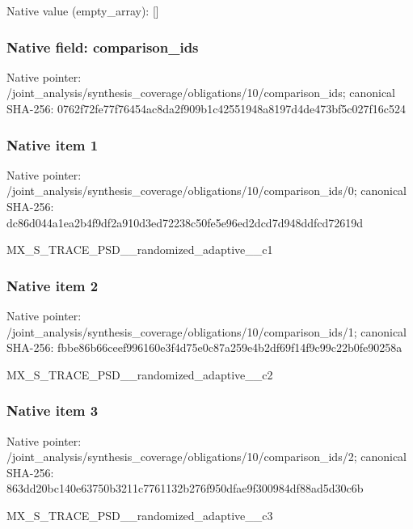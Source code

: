 \documentclass[10pt,a4paper]{article}
\begin{document}
Native value (empty\_\allowbreak{}array): []

\subsubsection{Native field: comparison\_\allowbreak{}ids}
Native pointer: /joint\_\allowbreak{}analysis/synthesis\_\allowbreak{}coverage/obligations/10/comparison\_\allowbreak{}ids; canonical SHA-256: 0762f72fe77f76454ac8da2f909b1c42551948a8197d4de473bf5c027f16c524

\subsubsection{Native item 1}
Native pointer: /joint\_\allowbreak{}analysis/synthesis\_\allowbreak{}coverage/obligations/10/comparison\_\allowbreak{}ids/0; canonical SHA-256: dc86d044a1ea2b4f9df2a910d3ed72238c50fe5e96ed2dcd7d948ddfcd72619d

\begingroup\raggedright\sloppy MX\_\allowbreak{}S\_\allowbreak{}TRACE\_\allowbreak{}PSD\_\allowbreak{}\_\allowbreak{}randomized\_\allowbreak{}adaptive\_\allowbreak{}\_\allowbreak{}c1\par\endgroup

\subsubsection{Native item 2}
Native pointer: /joint\_\allowbreak{}analysis/synthesis\_\allowbreak{}coverage/obligations/10/comparison\_\allowbreak{}ids/1; canonical SHA-256: fbbe86b66ceef996160e3f4d75e0c87a259e4b2df69f14f9c99c22b0fe90258a

\begingroup\raggedright\sloppy MX\_\allowbreak{}S\_\allowbreak{}TRACE\_\allowbreak{}PSD\_\allowbreak{}\_\allowbreak{}randomized\_\allowbreak{}adaptive\_\allowbreak{}\_\allowbreak{}c2\par\endgroup

\subsubsection{Native item 3}
Native pointer: /joint\_\allowbreak{}analysis/synthesis\_\allowbreak{}coverage/obligations/10/comparison\_\allowbreak{}ids/2; canonical SHA-256: 863dd20bc140e63750b3211c7761132b276f950dfae9f300984df88ad5d30c6b

\begingroup\raggedright\sloppy MX\_\allowbreak{}S\_\allowbreak{}TRACE\_\allowbreak{}PSD\_\allowbreak{}\_\allowbreak{}randomized\_\allowbreak{}adaptive\_\allowbreak{}\_\allowbreak{}c3\par\endgroup
\end{document}
